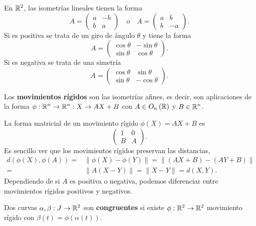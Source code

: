 \begin{eg}
En $\displaystyle \mathbb{R}^{2} $, las isometrías lineales tienen la forma
\[A = \begin{pmatrix} a & -b \\ b &a \end{pmatrix}\quad \text{o} \quad A = \begin{pmatrix} a &b \\ b & -a \end{pmatrix} .\]
Si es positiva se trata de un giro de ángulo $\displaystyle \theta $ y tiene la forma
\[A = \begin{pmatrix}  \cos \theta & -\sin \theta \\ \sin \theta & \cos \theta \end{pmatrix} .\]
Si es negativa se trata de una simetría
\[A =\begin{pmatrix} \cos \theta & \sin \theta \\ \sin \theta & -\cos\theta  \end{pmatrix} .\]
\end{eg}
\begin{definition}
Los \textbf{movimientos rígidos} son las isometrías afines, es decir, son aplicaciones de la forma $\displaystyle \phi : \mathbb{R}^{n} \to \mathbb{R}^{n} : X \to AX + B $ con $\displaystyle A \in O_{n}\left(\mathbb{R}\right) $ y $\displaystyle B \in \mathbb{R}^{n} $.  
\end{definition}
\begin{observation}
La forma matricial de un movimiento rígido $\displaystyle \phi\left(X\right)=AX + B $ es
\[\begin{pmatrix} 1 & 0 \\ B & A \end{pmatrix} .\]
Es sencillo ver que los movimientos rígidos preservan las distancias,
\[
\begin{split}
	d\left(\phi\left(X\right), \phi\left(A\right)\right) = & \|\phi\left(X\right)-\phi\left(Y\right)\| 
	=   \|\left(AX + B\right)-\left(AY + B\right)\| \\
	= &  \|A\left(X-Y\right)\| = \|X-Y\| = d\left(X,Y\right).
\end{split}
\]
Dependiendo de si $\displaystyle A $ es positiva o negativa, podemos diferenciar entre movimientos rígidos positivos y negativos. 
\end{observation}

\begin{definition}
Dos curvas $\displaystyle \alpha, \beta : J \to \mathbb{R}^{2} $ son \textbf{congruentes} si existe $\displaystyle \phi:\mathbb{R}^{2} \to \mathbb{R}^{2} $ movimiento rígido con $\displaystyle \beta\left(t\right)=\phi\left(\alpha\left(t\right)\right) $. 
\end{definition}
 
